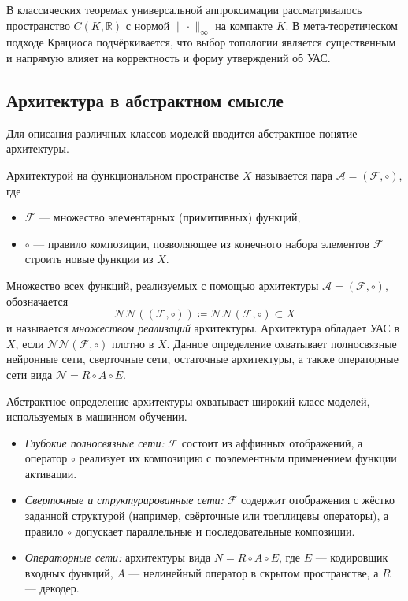 \documentclass[../NDCNNAI_main.tex]{subfiles}
\begin{document}
В классических теоремах универсальной аппроксимации рассматривалось пространство
$C(K,\mathbb{R})$ с нормой $\|\cdot\|_\infty$ на компакте $K$.
В мета-теоретическом подходе Крациоса подчёркивается, что выбор топологии является
существенным и напрямую влияет на корректность и форму утверждений об УАС.

\subsection{Архитектура в абстрактном смысле}
Для описания различных классов моделей вводится абстрактное понятие архитектуры.

\begin{definition}[Архитектура]
Архитектурой на функциональном пространстве $X$ называется пара
$\mathcal{A}=(\mathcal{F},\circ)$, где
\begin{itemize}
  \item $\mathcal{F}$ --- множество элементарных (примитивных) функций,
  \item $\circ$ --- правило композиции, позволяющее из конечного набора элементов
  $\mathcal{F}$ строить новые функции из $X$.
\end{itemize}
\end{definition}
\noindent
Множество всех функций, реализуемых с помощью архитектуры
$\mathcal{A}=(\mathcal{F},\circ)$, обозначается
\[
\mathcal{NN}((\mathcal{F},\circ)) \coloneq \mathcal{NN}(\mathcal{F},\circ)\subset X
\]
и называется \emph{множеством реализаций} архитектуры.
Архитектура обладает УАС в $X$, если $\mathcal{NN}(\mathcal{F},\circ)$ плотно в $X$.
Данное определение охватывает полносвязные нейронные сети, сверточные сети,
остаточные архитектуры, а также операторные сети вида
$\mathcal{N} = R\circ A \circ E$.

\begin{example}
  Абстрактное определение архитектуры охватывает широкий класс моделей,
  используемых в машинном обучении.
  \begin{itemize}
    \item \emph{Глубокие полносвязные сети:}
    $\mathcal{F}$ состоит из аффинных отображений, а оператор $\circ$
    реализует их композицию с поэлементным применением функции активации.
    \item \emph{Сверточные и структурированные сети:}
    $\mathcal{F}$ содержит отображения с жёстко заданной структурой
    (например, свёрточные или тоеплицевы операторы), а правило $\circ$
    допускает параллельные и последовательные композиции.
    \item \emph{Операторные сети:}
    архитектуры вида $N = R \circ A \circ E$, где $E$ --- кодировщик входных функций,
    $A$ --- нелинейный оператор в скрытом пространстве, а $R$ --- декодер.
  \end{itemize}
  
\end{example}
\end{document}
